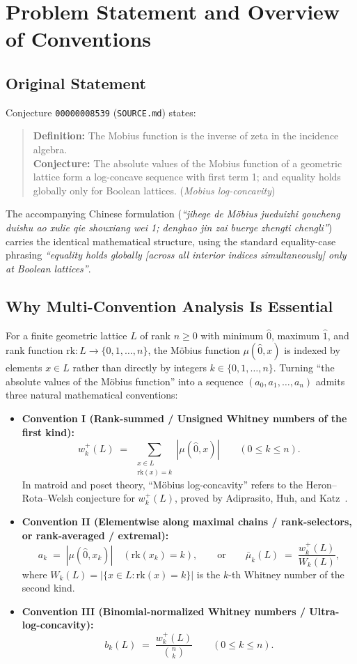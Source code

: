 \documentclass[11pt]{article}
\theoremstyle{definition}
\theoremstyle{remark}
\newcommand{\rk}{\mathrm{rk}}
\newcommand{\hatzero}{\hat{0}}
\newcommand{\hatone}{\hat{1}}
\begin{document}
\section{Problem Statement and Overview of Conventions}

\subsection{Original Statement}
Conjecture \texttt{00000008539} (\texttt{SOURCE.md}) states:
\begin{quote}
\textbf{Definition:} The Mobius function is the inverse of zeta in the incidence algebra.\\
\textbf{Conjecture:} The absolute values of the Mobius function of a geometric lattice form a log-concave sequence with first term 1; and equality holds globally only for Boolean lattices. (\emph{Mobius log-concavity})
\end{quote}
The accompanying Chinese formulation (\emph{``jihege de M\"obius jueduizhi goucheng duishu ao xulie qie shouxiang wei 1; denghao jin zai buerge zhengti chengli''}) carries the identical mathematical structure, using the standard equality-case phrasing \emph{``equality holds globally [across all interior indices simultaneously] only at Boolean lattices''}.

\subsection{Why Multi-Convention Analysis Is Essential}
For a finite geometric lattice $L$ of rank $n \ge 0$ with minimum $\hatzero$, maximum $\hatone$, and rank function $\rk : L \to \{0,1,\dots,n\}$, the M\"obius function $\mu(\hatzero, x)$ is indexed by elements $x \in L$ rather than directly by integers $k \in \{0,1,\dots,n\}$. Turning ``the absolute values of the M\"obius function'' into a sequence $(a_0, a_1, \dots, a_n)$ admits three natural mathematical conventions:
\begin{itemize}
  \item \textbf{Convention I (Rank-summed / Unsigned Whitney numbers of the first kind):}
  \[
    w_k^+(L) \;=\; \sum_{\substack{x \in L \\ \rk(x)=k}} |\mu(\hatzero, x)| \qquad (0 \le k \le n).
  \]
  In matroid and poset theory, ``M\"obius log-concavity'' refers to the Heron--Rota--Welsh conjecture for $w_k^+(L)$, proved by Adiprasito, Huh, and Katz~\cite{AHK2018}.
  \item \textbf{Convention II (Elementwise along maximal chains / rank-selectors, or rank-averaged / extremal):}
  \[
    a_k \;=\; |\mu(\hatzero, x_k)| \quad (\rk(x_k)=k), \qquad \text{or} \qquad \bar{\mu}_k(L) \;=\; \frac{w_k^+(L)}{W_k(L)},
  \]
  where $W_k(L) = |\{x \in L : \rk(x)=k\}|$ is the $k$-th Whitney number of the second kind.
  \item \textbf{Convention III (Binomial-normalized Whitney numbers / Ultra-log-concavity):}
  \[
    b_k(L) \;=\; \frac{w_k^+(L)}{\binom{n}{k}} \qquad (0 \le k \le n).
  \]
\end{itemize}
\end{document}
